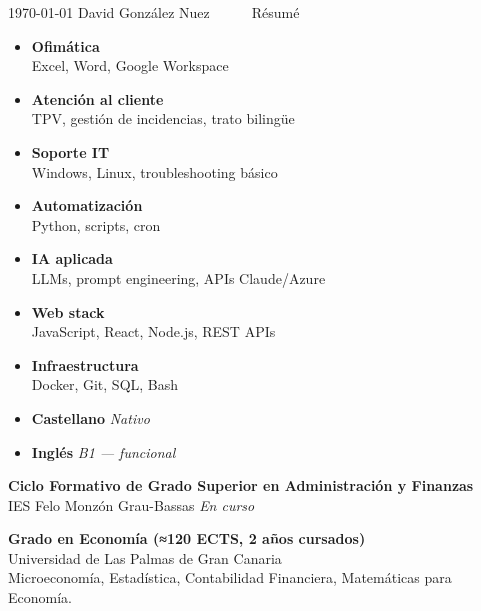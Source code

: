 \documentclass[10pt, a4paper]{awesome-cv}
\begin{document}
\makecvheader[C]
\makecvfooter
  { \today }
  { David González Nuez~~~\textperiodcentered~~~Résumé }
  { \thepage }

\noindent\begin{minipage}[t]{0.32\textwidth}
\vspace{0pt}



\begin{itemize}[leftmargin=*, label={}, itemsep=2pt]
\item \textbf{Ofimática}\\{\footnotesize Excel, Word, Google Workspace}
\item \textbf{Atención al cliente}\\{\footnotesize TPV, gestión de incidencias, trato bilingüe}
\item \textbf{Soporte IT}\\{\footnotesize Windows, Linux, troubleshooting básico}
\item \textbf{Automatización}\\{\footnotesize Python, scripts, cron}
\item \textbf{IA aplicada}\\{\footnotesize LLMs, prompt engineering, APIs Claude/Azure}
\item \textbf{Web stack}\\{\footnotesize JavaScript, React, Node.js, REST APIs}
\item \textbf{Infraestructura}\\{\footnotesize Docker, Git, SQL, Bash}
\end{itemize}



\begin{itemize}[leftmargin=*, label={}, itemsep=2pt]
\item \textbf{Castellano} \hfill \textit{Nativo}
\item \textbf{Inglés} \hfill \textit{B1 — funcional}
\end{itemize}



\par\vspace{4pt}
\textbf{Ciclo Formativo de Grado Superior en Administración y Finanzas}\\
{\small IES Felo Monzón Grau-Bassas \hfill\textit{En curso} }

\par\vspace{6pt}
\textbf{Grado en Economía (≈120 ECTS, 2 años cursados)}\\
{\small Universidad de Las Palmas de Gran Canaria  }\\
{\footnotesize\color{graytext}Microeconomía, Estadística, Contabilidad Financiera, Matemáticas para Economía.}




\end{minipage}
\end{document}
